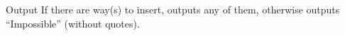 Output
If there are way(s) to insert, outputs any of them, otherwise outputs “Impossible” (without quotes).

 